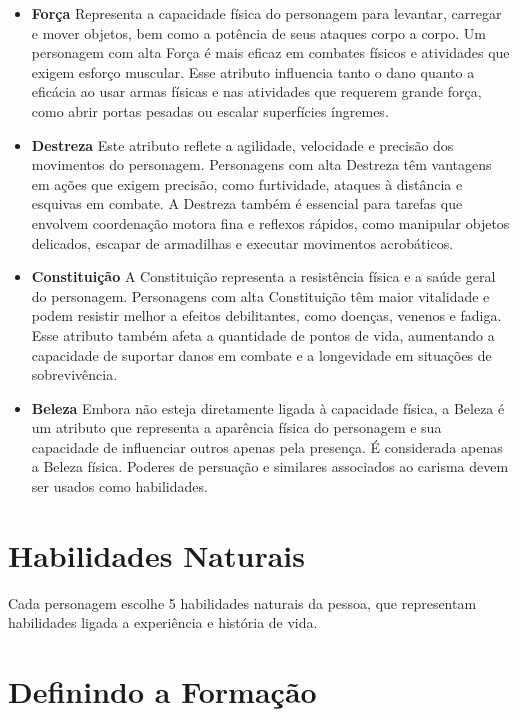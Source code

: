 \documentclass[a4paper,12pt]{book}
\begin{document}
\begin{itemize}
\item \textbf{Força} Representa a capacidade física do personagem para levantar, carregar e mover objetos, bem como a potência de seus ataques corpo a corpo. Um personagem com alta Força é mais eficaz em combates físicos e atividades que exigem esforço muscular. Esse atributo influencia tanto o dano quanto a eficácia ao usar armas físicas e nas atividades que requerem grande força, como abrir portas pesadas ou escalar superfícies íngremes.
\item \textbf{Destreza} Este atributo reflete a agilidade, velocidade e precisão dos movimentos do personagem. Personagens com alta Destreza têm vantagens em ações que exigem precisão, como furtividade, ataques à distância e esquivas em combate. A Destreza também é essencial para tarefas que envolvem coordenação motora fina e reflexos rápidos, como manipular objetos delicados, escapar de armadilhas e executar movimentos acrobáticos.

\item \textbf{Constituição} A Constituição representa a resistência física e a saúde geral do personagem. Personagens com alta Constituição têm maior vitalidade e podem resistir melhor a efeitos debilitantes, como doenças, venenos e fadiga. Esse atributo também afeta a quantidade de pontos de vida, aumentando a capacidade de suportar danos em combate e a longevidade em situações de sobrevivência.

\item \textbf{Beleza} Embora não esteja diretamente ligada à capacidade física, a Beleza é um atributo que representa a aparência física do personagem e sua capacidade de influenciar outros apenas pela presença. É considerada apenas a Beleza física. Poderes de persuação e similares associados ao carisma devem ser usados como habilidades.

\end{itemize}

\section{Habilidades Naturais}

Cada personagem escolhe 5 habilidades naturais da pessoa, que representam habilidades ligada a experiência e história de vida.

\section{Definindo a Formação}
\end{document}
